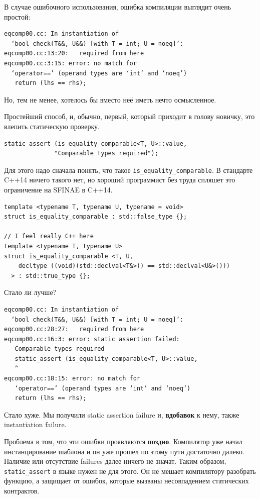 \documentclass[a4paper,12pt,oneside]{article}
\begin{document}
В случае ошибочного использования, ошибка компиляции выглядит очень простой:

\begin{verbatim}
eqcomp00.cc: In instantiation of 
  ‘bool check(T&&, U&&) [with T = int; U = noeq]’:
eqcomp00.cc:13:20:   required from here
eqcomp00.cc:3:15: error: no match for 
  ‘operator==’ (operand types are ‘int’ and ‘noeq’)
   return (lhs == rhs);
\end{verbatim}

Но, тем не менее, хотелось бы вместо неё иметь нечто осмысленное.

Простейший способ, и, обычно, первый, который приходит в голову новичку, это влепить статическую проверку.

\begin{lstlisting}
static_assert (is_equality_comparable<T, U>::value, 
              "Comparable types required");
\end{lstlisting}

Для этого надо сначала понять, что такое \lstinline!is_equality_comparable!. В стандарте C++14 ничего такого нет, но хороший программист без труда спляшет это ограничение на SFINAE в C++14.

\begin{lstlisting}
template <typename T, typename U, typename = void>
struct is_equality_comparable : std::false_type {};

// I feel really C++ here
template <typename T, typename U>
struct is_equality_comparable <T, U,
    decltype ((void)(std::declval<T&>() == std::declval<U&>()))
  > : std::true_type {};
\end{lstlisting}

Стало ли лучше?

\begin{verbatim}
eqcomp00.cc: In instantiation of 
  ‘bool check(T&&, U&&) [with T = int; U = noeq]’:
eqcomp00.cc:28:27:   required from here
eqcomp00.cc:16:3: error: static assertion failed: 
   Comparable types required
   static_assert (is_equality_comparable<T, U>::value, 
   ^
eqcomp00.cc:18:15: error: no match for 
   ‘operator==’ (operand types are ‘int’ and ‘noeq’)
   return (lhs == rhs);
\end{verbatim}

Стало хуже. Мы получили static assertion failure и, \textbf{вдобавок} к нему, также instantiation failure.

Проблема в том, что эти ошибки проявляются \textbf{поздно}. Компилятор уже начал инстанцирование шаблона и он уже прошел по этому пути достаточно далеко. Наличие или отсутствие failures далее ничего не значат. Таким образом, \lstinline!static_assert! в языке нужен не для этого. Он не мешает компилятору разобрать функцию, а защищает от ошибок, которые вызваны несовпадением статических контрактов.
\end{document}
